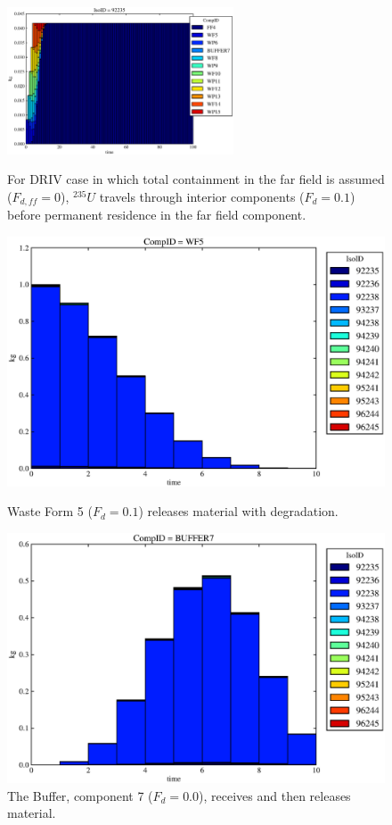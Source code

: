 \begin{figure}[ht]
\centering
\includegraphics[width=0.6\textwidth]{./chapters/demonstration/base/drIV.eps}
\caption[$^{235}U$ residence. Degradation Rate Buffer No Release.]{
For DRIV case in which total containment in the far field is assumed ($F_{d,ff}=0$), 
$^{235}U$ travels through interior components ($F_d = 0.1$) before 
permanent residence in the far field component.
}
\label{fig:drIVall}
\begin{minipage}[b]{0.45\linewidth}

  \includegraphics[width=\textwidth]{./chapters/demonstration/base/drIV1.eps}
  \caption[Case DRIV Waste Form Contaminants.]{
    Waste Form 5 ($F_d = 0.1$) releases material with degradation. 
    }
  \label{fig:drIVwf5}
  
  \includegraphics[width=\textwidth]{./chapters/demonstration/base/drIV3.eps}
  \caption[Case DRIV Buffer Contaminants]{
    The Buffer, component 7 ($F_d=0.0$), receives and then releases material.
    }
  \label{fig:drIVbuff}


\end{minipage}
\end{figure}
